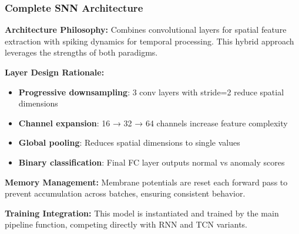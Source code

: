 \documentclass[12pt,a4paper]{article}
\begin{document}
\subsubsection{Complete SNN Architecture}

\textbf{Architecture Philosophy:} Combines convolutional layers for spatial feature extraction with spiking dynamics for temporal processing. This hybrid approach leverages the strengths of both paradigms.

\textbf{Layer Design Rationale:}
\begin{itemize}
    \item \textbf{Progressive downsampling}: 3 conv layers with stride=2 reduce spatial dimensions
    \item \textbf{Channel expansion}: 16 → 32 → 64 channels increase feature complexity
    \item \textbf{Global pooling}: Reduces spatial dimensions to single values
    \item \textbf{Binary classification}: Final FC layer outputs normal vs anomaly scores
\end{itemize}

\textbf{Memory Management:} Membrane potentials are reset each forward pass to prevent accumulation across batches, ensuring consistent behavior.

\textbf{Training Integration:} This model is instantiated and trained by the main pipeline function, competing directly with RNN and TCN variants.
\end{document}

